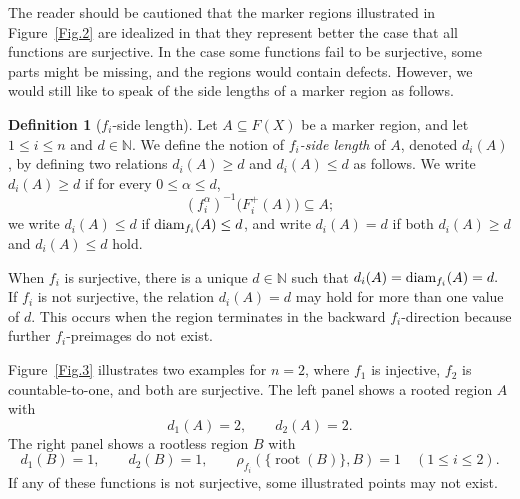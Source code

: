 \documentclass[11pt, reqno, a4paper]{amsart}
\theoremstyle{definition}
\newtheorem{definition}[theorem]{Definition}
\theoremstyle{plain}
\newcommand{\diam}{\text{\rm diam}}
\begin{document}
The reader should be cautioned that the marker regions illustrated in Figure~\ref{Fig.2} are idealized in that they represent better the case that all functions are surjective. In the case some functions fail to be surjective, some parts might be missing, and the regions would contain defects. However, we would still like to speak of the side lengths of a marker region as follows.  

\begin{definition}[$f_i$-side length]
Let $A\subseteq F(X)$ be a marker region,  and let $1\le i\le n$ and $d\in\mathbb N$. We define the notion of \emph{$f_i$-side length} of $A$, denoted $d_i(A)$, by defining two relations $d_i(A)\geq d$ and $d_i(A)\leq d$ as follows.
We write
$d_i(A)\ge d$
if for every $0\le \alpha\le d$,
$$ (f_i^\alpha)^{-1}\bigl(F_i^+(A)\bigr)\subseteq A;$$
we write
$d_i(A)\le d$
if
$\diam_{f_i}(A)\le d$,
and write
$d_i(A)=d$
if both $d_i(A)\ge d$ and $d_i(A)\le d$ hold.
\end{definition}


When $f_i$ is surjective, there is a unique $d\in\mathbb N$ such that
$d_i(A)=\diam_{f_i}(A)=d.
$
If $f_i$ is not surjective, the relation $d_i(A)=d$ may hold for more
than one value of $d$. This occurs when the region terminates in the
backward $f_i$-direction because further $f_i$-preimages do not exist.


Figure~\ref{Fig.3} illustrates two examples for $n=2$, where $f_1$ is injective, $f_2$ is
countable-to-one, and both are surjective. 
The left panel shows a rooted region $A$ with
$$
d_1(A)=2,\qquad d_2(A)=2.
$$
The right panel shows a
rootless region $B$ with
$$
d_1(B)=1,\qquad d_2(B)=1,
\qquad
\rho_{f_i}(\{\operatorname{root}(B)\},B)=1
\quad (1\le i\le 2).
$$
If any of these functions is not surjective, some illustrated points may not exist.
\end{document}
